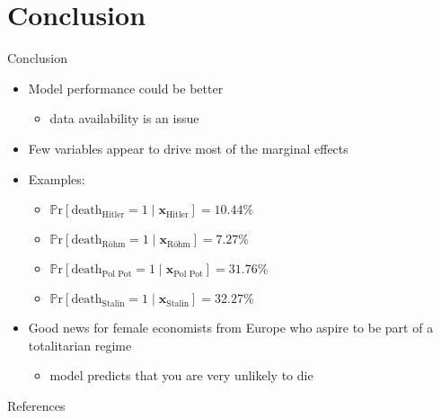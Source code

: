 \documentclass{beamer}
\begin{document}
\section{Conclusion}
\begin{frame}{Conclusion}
	\begin{itemize}
	\item Model performance could be better
		\begin{itemize}
		\item data availability is an issue
		\end{itemize}
	\item Few variables appear to drive most of the marginal effects
	\item Examples:
		\begin{itemize}
		\item $\mathbb P\text{r}[\text{death}_{\text{Hitler}} = 1 \mid \mathbf x_{\text{Hitler}}]=10.44\%$
		\item $\mathbb P\text{r}[\text{death}_{\text{Röhm}} = 1 \mid \mathbf x_{\text{Röhm}}]=7.27\%$
		\item $\mathbb P\text{r}[\text{death}_{\text{Pol Pot}} = 1 \mid \mathbf x_{\text{Pol Pot}}]=31.76\%$
		\item $\mathbb P\text{r}[\text{death}_{\text{Stalin}} = 1 \mid \mathbf x_{\text{Stalin}}]=32.27\%$
		\end{itemize}
	\item Good news for female economists from Europe who aspire to be part of a totalitarian regime
		\begin{itemize}
		\item model predicts that you are very unlikely to die
		\end{itemize}
	\end{itemize}
\nocite{Matthews.2019} \nocite{Abarca.2018} \nocite{Basu.2005} \nocite{Harrison.1998} \nocite{Matthews.2018} \nocite{UnitedNations.1989} \nocite{spechlet.1985} \nocite{markevich.harrison.2011} \nocite{Bolt.2020}	
\end{frame}
\begin{frame}{References}
	\printbibliography
\end{frame}
\end{document}

